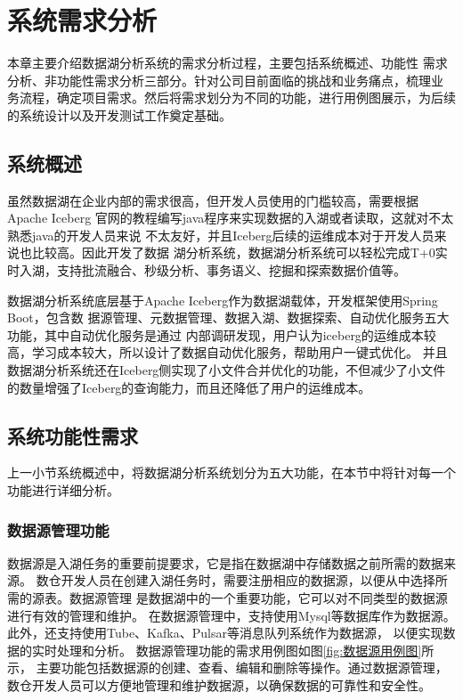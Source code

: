 
\chapter{系统需求分析}

本章主要介绍数据湖分析系统的需求分析过程，主要包括系统概述、功能性
需求分析、非功能性需求分析三部分。针对公司目前面临的挑战和业务痛点，梳理业
务流程，确定项目需求。然后将需求划分为不同的功能，进行用例图展示，为后续的系统设计以及开发测试工作奠定基础。

\section{系统概述}

虽然数据湖在企业内部的需求很高，但开发人员使用的门槛较高，需要根据Apache Iceberg
官网的教程编写java程序来实现数据的入湖或者读取，这就对不太熟悉java的开发人员来说
不太友好，并且Iceberg后续的运维成本对于开发人员来说也比较高。因此开发了数据
湖分析系统，数据湖分析系统可以轻松完成T+0实时入湖，支持批流融合、秒级分析、事务语义、挖掘和探索数据价值等。

数据湖分析系统底层基于Apache Iceberg作为数据湖载体，开发框架使用Spring Boot，包含数
据源管理、元数据管理、数据入湖、数据探索、自动优化服务五大功能，其中自动优化服务是通过
内部调研发现，用户认为iceberg的运维成本较高，学习成本较大，所以设计了数据自动优化服务，帮助用户一键式优化。
并且数据湖分析系统还在Iceberg侧实现了小文件合并优化的功能，不但减少了小文件的数量增强了Iceberg的查询能力，而且还降低了用户的运维成本。

\section{系统功能性需求}

上一小节系统概述中，将数据湖分析系统划分为五大功能，在本节中将针对每一个功能进行详细分析。

\subsection{数据源管理功能}

数据源是入湖任务的重要前提要求，它是指在数据湖中存储数据之前所需的数据来源。
数仓开发人员在创建入湖任务时，需要注册相应的数据源，以便从中选择所需的源表。数据源管理
是数据湖中的一个重要功能，它可以对不同类型的数据源进行有效的管理和维护。
在数据源管理中，支持使用Mysql等数据库作为数据源。
此外，还支持使用Tube、Kafka、Pulsar等消息队列系统作为数据源，
以便实现数据的实时处理和分析。
数据源管理功能的需求用例图如图\ref{fig:数据源用例图}所示，
主要功能包括数据源的创建、查看、编辑和删除等操作。通过数据源管理，
数仓开发人员可以方便地管理和维护数据源，以确保数据的可靠性和安全性。

